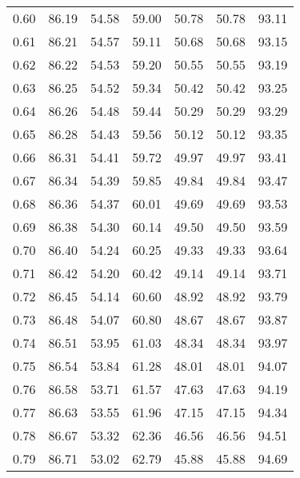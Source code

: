 \begin{tabular}{|c|c|c|c|c|c|c|}
      0.60 &     86.19 &     54.58 &      59.00 &   50.78 &      50.78 &         93.11 \\
      0.61 &     86.21 &     54.57 &      59.11 &   50.68 &      50.68 &         93.15 \\
      0.62 &     86.22 &     54.53 &      59.20 &   50.55 &      50.55 &         93.19 \\
      0.63 &     86.25 &     54.52 &      59.34 &   50.42 &      50.42 &         93.25 \\
      0.64 &     86.26 &     54.48 &      59.44 &   50.29 &      50.29 &         93.29 \\
      0.65 &     86.28 &     54.43 &      59.56 &   50.12 &      50.12 &         93.35 \\
      0.66 &     86.31 &     54.41 &      59.72 &   49.97 &      49.97 &         93.41 \\
      0.67 &     86.34 &     54.39 &      59.85 &   49.84 &      49.84 &         93.47 \\
      0.68 &     86.36 &     54.37 &      60.01 &   49.69 &      49.69 &         93.53 \\
      0.69 &     86.38 &     54.30 &      60.14 &   49.50 &      49.50 &         93.59 \\
      0.70 &     86.40 &     54.24 &      60.25 &   49.33 &      49.33 &         93.64 \\
      0.71 &     86.42 &     54.20 &      60.42 &   49.14 &      49.14 &         93.71 \\
      0.72 &     86.45 &     54.14 &      60.60 &   48.92 &      48.92 &         93.79 \\
      0.73 &     86.48 &     54.07 &      60.80 &   48.67 &      48.67 &         93.87 \\
      0.74 &     86.51 &     53.95 &      61.03 &   48.34 &      48.34 &         93.97 \\
      0.75 &     86.54 &     53.84 &      61.28 &   48.01 &      48.01 &         94.07 \\
      0.76 &     86.58 &     53.71 &      61.57 &   47.63 &      47.63 &         94.19 \\
      0.77 &     86.63 &     53.55 &      61.96 &   47.15 &      47.15 &         94.34 \\
      0.78 &     86.67 &     53.32 &      62.36 &   46.56 &      46.56 &         94.51 \\
      0.79 &     86.71 &     53.02 &      62.79 &   45.88 &      45.88 &         94.69 \\

\end{tabular}
